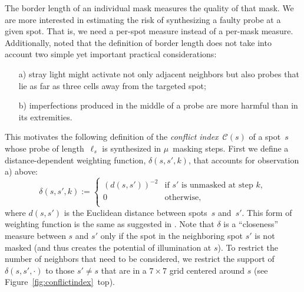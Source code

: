 \documentclass[english]{lni}
\begin{document}
The border length of an individual mask measures the quality of that
mask. We are more interested in estimating the risk of synthesizing a faulty
probe at a given spot. That is, we need a per-spot measure
instead of a per-mask measure. Additionally, \cite{KAHNG03A} noted
that the definition of border length does not take into account two
simple yet important practical considerations:
\begin{itemize}
\item[a)] stray light might activate not only adjacent neighbors but
  also probes that lie as far as three cells away from the targeted
  spot;
\item[b)] imperfections produced in the middle of a probe are more
  harmful than in its extremities.
\end{itemize}
This motivates the following definition of the \emph{conflict
  index}~$\mathcal{C}(s)$ of a spot~$s$ whose probe of
length~$\ell_{s}$ is synthesized in $\mu$~masking steps. First we
define a distance-dependent weighting function, $\delta(s,s',k)$, that
accounts for observation a) above:
\begin{equation}
\label{eq:dist_weight}
\delta(s,s',k) :=
\left\{
	\begin{array}{ll}
		(d(s,s'))^{-2} & \mbox{if $s'$ is unmasked at step $k$}, \\
		0 & \mbox{otherwise}, \\
	\end{array}
\right.
\end{equation}
where $d(s,s')$ is the Euclidean distance between spots~$s$ and~$s'$.
This form of weighting function is the same as suggested in
\cite{KAHNG03A}.  Note that $\delta$ is a ``closeness'' measure
between $s$ and $s'$ only if the spot in the neighboring spot $s'$ is
not masked (and thus creates the potential of illumination at $s$). To
restrict the number of neighbors that need to be considered, we
restrict the support of $\delta(s,s',\cdot)$ to those $s'\neq s$ that
are in a $7\times 7$ grid centered around $s$ (see
Figure~\ref{fig:conflictindex}~top).
\end{document}
